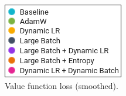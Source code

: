 \documentclass[10pt,conference]{IEEEtran}
\begin{document}
\begin{figure}[htbp]
  \centering
  \begin{minipage}[b]{\textwidth}
    \centering
  \end{minipage}
  \hfill
  \begin{minipage}[b]{\textwidth}
    \centering
    \includegraphics{figs/legend.png}
    \caption{Value function loss (smoothed).}
    \label{fig:value_loss}
  \end{minipage}
\end{figure}
\end{document}
